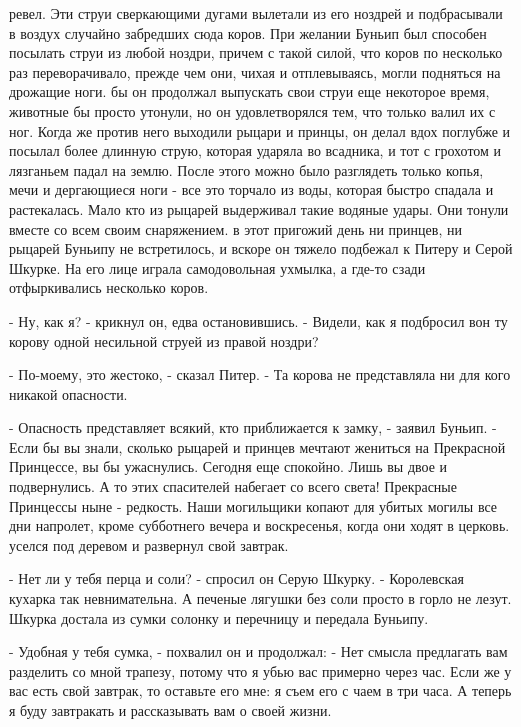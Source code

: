ревел. Эти струи сверкающими дугами вылетали из его ноздрей и 
подбрасывали в воздух случайно забредших сюда коров. При желании 
Буньип был способен посылать струи из любой ноздри, причем с такой 
силой, что коров по несколько раз переворачивало, прежде чем они, 
чихая и отплевываясь, могли подняться на дрожащие ноги.
 бы он продолжал выпускать свои струи еще некоторое время, 
животные бы просто утонули, но он удовлетворялся тем, что только валил 
их с ног. Когда же против него выходили рыцари и принцы, он делал вдох 
поглубже и посылал более длинную струю, которая ударяла во всадника, и 
тот с грохотом и лязганьем падал на землю. После этого можно было 
разглядеть только копья, мечи и дергающиеся ноги - все это торчало из 
воды, которая быстро спадала и растекалась. Мало кто из рыцарей 
выдерживал такие водяные удары. Они тонули вместе со всем своим 
снаряжением.
 в этот пригожий день ни принцев, ни рыцарей Буньипу не 
встретилось, и вскоре он тяжело подбежал к Питеру и Серой Шкурке. На 
его лице играла самодовольная ухмылка, а где-то сзади отфыркивались 
несколько коров.
\par- Ну, как я? - крикнул он, едва остановившись. - Видели, как я 
подбросил вон ту корову одной несильной струей из правой ноздри?
\par- По-моему, это жестоко, - сказал Питер. - Та корова не 
представляла ни для кого никакой опасности.
\par- Опасность представляет всякий, кто приближается к замку, - 
заявил Буньип. - Если бы вы знали, сколько рыцарей и принцев мечтают 
жениться на Прекрасной Принцессе, вы бы ужаснулись. Сегодня еще 
спокойно. Лишь вы двое и подвернулись. А то этих спасителей набегает 
со всего света! Прекрасные Принцессы ныне - редкость. Наши могильщики 
копают для убитых могилы все дни напролет, кроме субботнего вечера и 
воскресенья, когда они ходят в церковь.
 уселся под деревом и развернул свой завтрак.
\par- Нет ли у тебя перца и соли? - спросил он Серую Шкурку. - 
Королевская кухарка так невнимательна. А печеные лягушки без соли 
просто в горло не лезут.
 Шкурка достала из сумки солонку и перечницу и передала 
Буньипу.
\par- Удобная у тебя сумка, - похвалил он и продолжал: - Нет смысла 
предлагать вам разделить со мной трапезу, потому что я убью вас 
примерно через час. Если же у вас есть свой завтрак, то оставьте его 
мне: я съем его с чаем в три часа. А теперь я буду завтракать и 
рассказывать вам о своей жизни.
